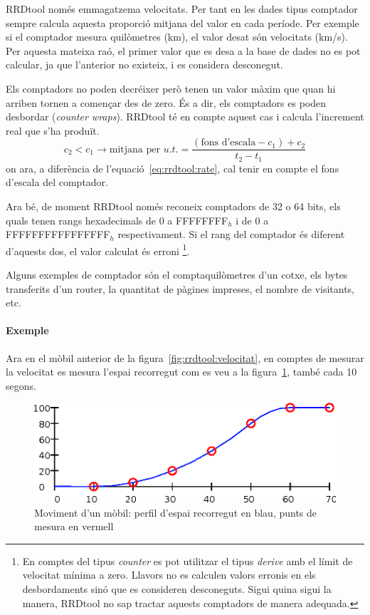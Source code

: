 RRDtool només emmagatzema velocitats. Per tant en les dades tipus comptador sempre calcula aquesta proporció mitjana del valor en cada període. Per exemple si el comptador mesura quilòmetres (km), el valor desat són velocitats (km/s).
Per aquesta mateixa raó, el primer valor que es desa a la base de dades no es pot calcular, ja que l'anterior no existeix, i es considera desconegut.

Els comptadors no poden decréixer però tenen un valor màxim que quan hi arriben tornen a començar des de zero. És a dir, els comptadors es poden desbordar (\emph{counter wraps}). RRDtool té en compte aquest cas i calcula l'increment real que s'ha produït. 
\begin{equation}\label{eq:rrdtool:wrap}
c_2 < c_1 \longrightarrow \text{mitjana per }u.t. =\frac{(\text{fons d'escala} -c_1)+c_2}{t_2-t_1}
\end{equation}
on ara, a diferència de l'equació~\ref{eq:rrdtool:rate}, cal tenir en compte el fons d'escala del comptador. 

Ara bé, de moment RRDtool només reconeix comptadors de 32 o 64 bits, els quals tenen rangs hexadecimals de 0 a FFFFFFFF$_h$ i de 0 a FFFFFFFFFFFFFFFF$_h$ respectivament. Si el rang del comptador és diferent d'aquests dos, el valor calculat és erroni
\footnote{En comptes del tipus \emph{counter} es pot utilitzar el tipus \emph{derive} amb el límit de velocitat mínima a zero. Llavors no es calculen valors erronis en els desbordaments sinó que es consideren desconeguts. Sigui quina sigui la manera, RRDtool no sap tractar aquests comptadors de manera adequada.\label{peu:rrdtool:counter}}.

Alguns exemples de comptador són el comptaquilòmetres d'un cotxe, els bytes transferits d'un router, la quantitat de pàgines impreses, el nombre de visitants, etc.


\paragraph{Exemple} Ara en el mòbil anterior de la figura~\ref{fig:rrdtool:velocitat}, en comptes de mesurar la velocitat es mesura l'espai recorregut com es veu a la figura~\ref{fig:rrdtool:mostreig_comptador}, també cada 10 segons. 

\begin{figure}[htp]
  \centering
  \includegraphics[width=\textwidth]{imatges/rrdtool/mostreig_comptador.eps}
  \caption{Moviment d'un mòbil: perfil d'espai recorregut en blau, punts de mesura en vermell}
  \label{fig:rrdtool:mostreig_comptador}
\end{figure}

